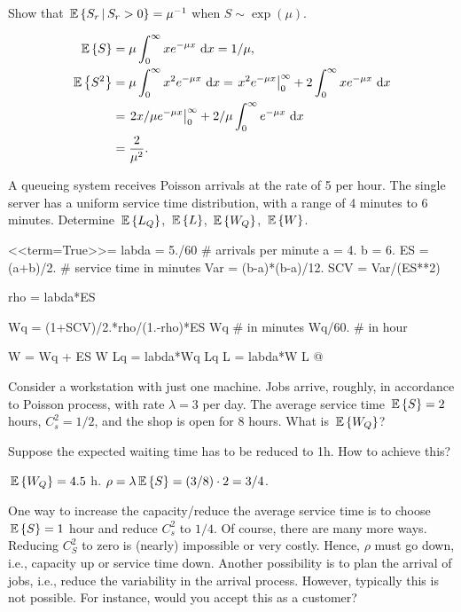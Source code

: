 \begin{question}
 Show that $\,\mathbb{E}\left\{S_r\,\middle|\, S_r>0\right\} = \mu^{-1}$ when $S\sim \exp(\mu)$.
\begin{solution}
    \begin{align*}
\,\mathbb{E}\left\{S\right\} &= \mu \int_0^\infty x e^{-\mu x}\,\,\text{d}x = 1/\mu, \\
\,\mathbb{E}\left\{S^2\right\} 
&= \mu \int_0^\infty x^2 e^{- \mu x} \,\,\text{d}x = \left. x^2 e^{-\mu x} \right|_0^\infty + 2 \int_0^\infty x e^{-\mu x} \, \,\text{d}x \\
&= \left. 2x/\mu e^{-\mu x} \right|_0^\infty + 2/\mu\int_0^\infty e^{-\mu x} \, \,\text{d}x\\
&=\frac2{\mu^2}.
    \end{align*}
\end{solution}
\end{question}


\begin{question}
  A queueing system receives Poisson arrivals at the rate of 5 per
  hour. The single server has a uniform service time distribution,
  with a range of 4 minutes to 6 minutes. Determine $\,\mathbb{E}\left\{L_Q\right\}$, $\,\mathbb{E}\left\{L\right\}$,
  $\,\mathbb{E}\left\{W_Q\right\}$, $\,\mathbb{E}\left\{W\right\}$.
  \begin{solution}

<<term=True>>=
labda = 5./60 # arrivals per minute
a = 4.
b = 6.
ES = (a+b)/2.  # service time in minutes
Var = (b-a)*(b-a)/12.
SCV = Var/(ES**2)

rho = labda*ES

Wq = (1+SCV)/2.*rho/(1.-rho)*ES
Wq # in minutes
Wq/60. # in hour


W = Wq + ES
W
Lq = labda*Wq
Lq
L = labda*W
L
@ 
  \end{solution}
\end{question}



\begin{question}
  Consider a workstation with just one machine. Jobs arrive, roughly,
  in accordance to Poisson process, with rate $\lambda=3$ per day. The
  average service time $\,\mathbb{E}\left\{S\right\} = 2$ hours, $C^2_s = 1/2$, and the shop
  is open for 8 hours. What is $\,\mathbb{E}\left\{W_Q\right\}$?

 Suppose the expected waiting time has to be reduced to 1h. How
  to achieve this? 
\begin{solution}
  $\,\mathbb{E}\left\{W_Q\right\} = 4.5$ h. $\rho = \lambda \,\mathbb{E}\left\{S\right\} = (3/8)\cdot 2 = 3/4$.

 One way to increase the capacity/reduce the average service
    time is to choose $\,\mathbb{E}\left\{S\right\} =1$ hour and reduce $C^2_s$ to $1/4$.  Of
    course, there are many more ways. Reducing $C^2_S$ to zero is
    (nearly) impossible or very costly. Hence, $\rho$ must go down,
    i.e., capacity up or service time down. Another possibility is to
    plan the arrival of jobs, i.e., reduce the variability in the
    arrival process. However, typically this is not possible. For
    instance, would you accept this as a customer?
\end{solution}

\end{question}


